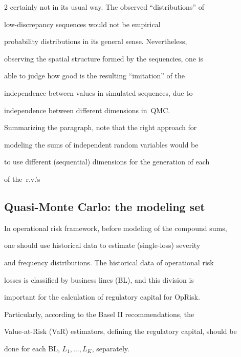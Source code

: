 \begin{multicols}{2}
certainly not in its usual way. The observed ``distributions'' of

low-discrepancy sequences would not be empirical

probability distributions in its general sense. Nevertheless,

observing the spatial structure formed by the sequencies, one is

able to judge how good is the resulting ``imitation'' of the

independence between values in simulated sequences, due to

independence between different dimensions in~QMC.

{



}



Summarizing the paragraph, note that the right approach for

modeling the sums of independent random variables would be

to use different (sequential) dimensions for the generation of each

of the~r.v.'s







\subsection{Quasi-Monte Carlo: the modeling set}\label{Makin}



\noindent

In operational risk framework, before modeling of the compound sums,

one should use historical data to estimate (single-loss) severity

and frequency distributions. The historical data of operational risk

losses is classified by business lines (BL), and this division is

important for the calculation of regulatory capital for OpRisk.

Particularly, according to the Basel II recommendations, the

Value-at-Risk  (VaR) estimators, defining the regulatory capital, should be

done for each BL, $L_1,\dots,L_K$, separately.




\end{multicols}
